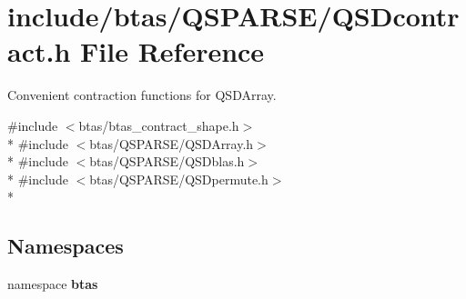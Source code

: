 \section{include/btas/\-Q\-S\-P\-A\-R\-S\-E/\-Q\-S\-Dcontract.h File Reference}
\label{dc/d13/QSDcontract_8h}


Convenient contraction functions for Q\-S\-D\-Array.  


{\ttfamily \#include $<$btas/btas\-\_\-contract\-\_\-shape.\-h$>$}\\*
{\ttfamily \#include $<$btas/\-Q\-S\-P\-A\-R\-S\-E/\-Q\-S\-D\-Array.\-h$>$}\\*
{\ttfamily \#include $<$btas/\-Q\-S\-P\-A\-R\-S\-E/\-Q\-S\-Dblas.\-h$>$}\\*
{\ttfamily \#include $<$btas/\-Q\-S\-P\-A\-R\-S\-E/\-Q\-S\-Dpermute.\-h$>$}\\*
\subsection*{Namespaces}
\begin{DoxyCompactItemize}
\item 
namespace {\bf btas}
\end{DoxyCompactItemize}
